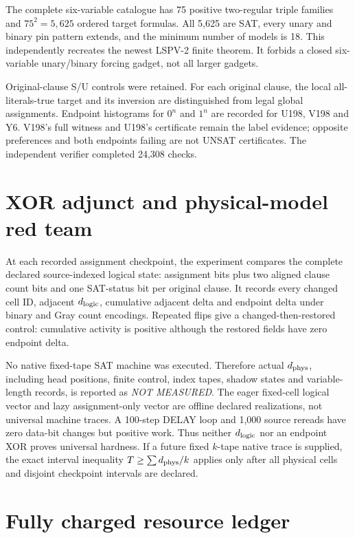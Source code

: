 \documentclass[11pt]{article}
\begin{document}
The complete six-variable catalogue has 75 positive two-regular triple
families and $75^2=5,625$ ordered target formulas.  All 5,625 are SAT, every
unary and binary pin pattern extends, and the minimum number of models is 18.
This independently recreates the newest LSPV-2 finite theorem.  It forbids a
closed six-variable unary/binary forcing gadget, not all larger gadgets.

Original-clause S/U controls were retained.  For each original clause, the
local all-literals-true target and its inversion are distinguished from legal
global assignments.  Endpoint histograms for $0^n$ and $1^n$ are recorded for
U198, V198 and Y6.  V198's full witness and U198's certificate remain the label
evidence; opposite preferences and both endpoints failing are not UNSAT
certificates.  The independent verifier completed 24,308 checks.

\section{XOR adjunct and physical-model red team}

At each recorded assignment checkpoint, the experiment compares the complete
declared source-indexed logical state: assignment bits plus two aligned clause
count bits and one SAT-status bit per original clause.  It records every
changed cell ID, adjacent $d_{\rm logic}$, cumulative adjacent delta and
endpoint delta under binary and Gray count encodings.  Repeated flips give a
changed-then-restored control: cumulative activity is positive although the
restored fields have zero endpoint delta.

No native fixed-tape SAT machine was executed.  Therefore actual
$d_{\rm phys}$, including head positions, finite control, index tapes, shadow
states and variable-length records, is reported as \emph{NOT MEASURED}.  The
eager fixed-cell logical vector and lazy assignment-only vector are offline
declared realizations, not universal machine traces.  A 100-step DELAY loop
and 1,000 source rereads have zero data-bit changes but positive work.  Thus
neither $d_{\rm logic}$ nor an endpoint XOR proves universal hardness.  If a
future fixed $k$-tape native trace is supplied, the exact interval inequality
$T\ge\sum d_{\rm phys}/k$ applies only after all physical cells and disjoint
checkpoint intervals are declared.

\section{Fully charged resource ledger}
\end{document}
